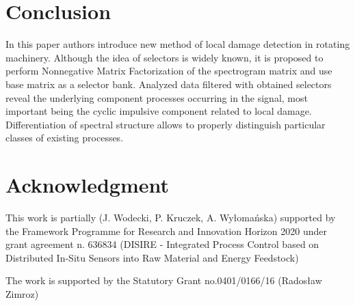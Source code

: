 \documentclass[conference,a4paper]{IEEEtran}
\begin{document}




\section{Conclusion}
In this paper authors introduce new method of local damage detection in rotating machinery. Although the idea of selectors is widely known, it is proposed to perform Nonnegative Matrix Factorization of the spectrogram matrix and use base matrix as a selector bank. Analyzed data filtered with obtained selectors reveal the underlying component processes occurring in the signal, most important being the cyclic impulsive component related to local damage. Differentiation of spectral structure allows to properly distinguish particular classes of existing processes.






\section*{Acknowledgment}
This work is partially (J. Wodecki, P. Kruczek, A. Wy{\l}oma{\'n}ska) supported by the Framework Programme for Research and Innovation Horizon 2020 under grant agreement n. 636834 (DISIRE - Integrated Process Control based on Distributed In-Situ Sensors into Raw Material and Energy Feedstock) 

The work is supported by the Statutory Grant no.0401/0166/16 (Rados{\l}aw Zimroz)





\end{document}
